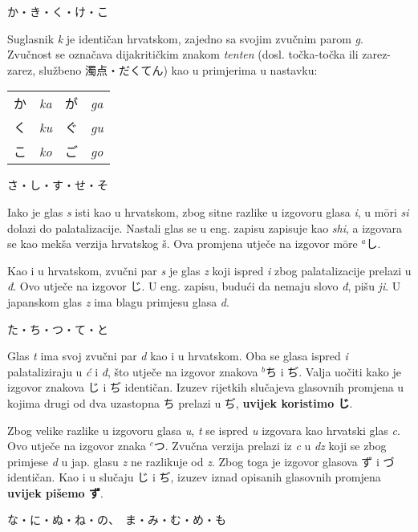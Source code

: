 	\vspace{5pt}
	\noindent\ten か・き・く・け・こ
	
	Suglasnik \textit{k} je identičan hrvatskom, zajedno sa svojim zvučnim parom \textit{g}. Zvučnost se označava dijakritičkim znakom \textit{tenten} (dosl. točka-točka ili zarez-zarez, službeno 濁点・だくてん) kao u primjerima u nastavku:
	
	\begin{tabular}{l l l l}
		か&\textit{ka}&が&\textit{ga}\\
		く&\textit{ku}&ぐ&\textit{gu}\\
		こ&\textit{ko}&ご&\textit{go}\\
	\end{tabular}

	\vspace{5pt}
	\noindent\ten さ・し・す・せ・そ
	
	Iako je glas \textit{s} isti kao u hrvatskom, zbog sitne razlike u izgovoru glasa \textit{i}, u m\={o}ri \textit{si} dolazi do palatalizacije. Nastali glas se u eng. zapisu zapisuje kao \textit{shi}, a izgovara se kao mekša verzija hrvatskog š. Ova promjena utječe na izgovor m\={o}re $^a$し.
	
	Kao i u hrvatskom, zvučni par \textit{s} je glas \textit{z} koji ispred \textit{i} zbog palatalizacije prelazi u \textit{đ}. Ovo utječe na izgovor じ. U eng. zapisu, budući da nemaju slovo \textit{đ}, pišu \textit{ji}. U japanskom glas \textit{z} ima blagu primjesu glasa \textit{d}.
	
	\vspace{5pt}
	\noindent\ten た・ち・つ・て・と
	
	Glas \textit{t} ima svoj zvučni par \textit{d} kao i u hrvatskom. Oba se glasa ispred \textit{i} palataliziraju u \textit{ć} i \textit{đ}, što utječe na izgovor znakova $^b$ち i ぢ. Valja uočiti kako je izgovor znakova じ i ぢ identičan. Izuzev rijetkih slučajeva glasovnih promjena u kojima drugi od dva uzastopna ち prelazi u ぢ, \textbf{uvijek koristimo じ}.
	
	Zbog velike razlike u izgovoru glasa \textit{u}, \textit{t} se ispred \textit{u} izgovara kao hrvatski glas \textit{c}. Ovo utječe na izgovor znaka $^c$つ. Zvučna verzija prelazi iz \textit{c} u \textit{dz} koji se zbog primjese \textit{d} u jap. glasu \textit{z} ne razlikuje od \textit{z}. Zbog toga je izgovor glasova ず i づ identičan. Kao i u slučaju じ i ぢ, izuzev iznad opisanih glasovnih promjena \textbf{uvijek pišemo ず}.
	
	\vspace{5pt}
	\noindent\ten な・に・ぬ・ね・の、　ま・み・む・め・も
	
